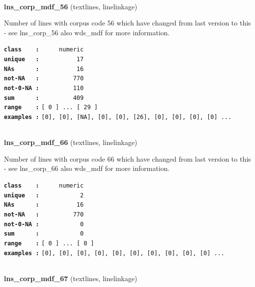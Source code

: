 \documentclass[]{article}
\begin{document}
~

\textbf{lns\_corp\_mdf\_56} (textlines, linelinkage)

Number of lines with corpus code 56 which have changed from last version
to this - see lns\_corp\_56 also wds\_mdf for more information.

\textbf{\texttt{class\ \ \ \ :}} \texttt{~~~~~numeric}\\
\textbf{\texttt{unique\ \ \ :}} \texttt{~~~~~~~~~~17}\\
\textbf{\texttt{NAs\ \ \ \ \ \ :}} \texttt{~~~~~~~~~~16}\\
\textbf{\texttt{not-NA\ \ \ :}} \texttt{~~~~~~~~~770}\\
\textbf{\texttt{not-0-NA\ :}} \texttt{~~~~~~~~~110}\\
\textbf{\texttt{sum\ \ \ \ \ \ :}} \texttt{~~~~~~~~~409}\\
\textbf{\texttt{range\ \ \ \ :}}
\texttt{{[}\ 0\ {]}\ ...\ {[}\ 29\ {]}}\\
\textbf{\texttt{examples\ :}}
\texttt{{[}0{]},\ {[}0{]},\ {[}NA{]},\ {[}0{]},\ {[}0{]},\ {[}26{]},\ {[}0{]},\ {[}0{]},\ {[}0{]},\ {[}0{]}\ ...}\\

~

\textbf{lns\_corp\_mdf\_66} (textlines, linelinkage)

Number of lines with corpus code 66 which have changed from last version
to this - see lns\_corp\_66 also wds\_mdf for more information.

\textbf{\texttt{class\ \ \ \ :}} \texttt{~~~~~numeric}\\
\textbf{\texttt{unique\ \ \ :}} \texttt{~~~~~~~~~~~2}\\
\textbf{\texttt{NAs\ \ \ \ \ \ :}} \texttt{~~~~~~~~~~16}\\
\textbf{\texttt{not-NA\ \ \ :}} \texttt{~~~~~~~~~770}\\
\textbf{\texttt{not-0-NA\ :}} \texttt{~~~~~~~~~~~0}\\
\textbf{\texttt{sum\ \ \ \ \ \ :}} \texttt{~~~~~~~~~~~0}\\
\textbf{\texttt{range\ \ \ \ :}}
\texttt{{[}\ 0\ {]}\ ...\ {[}\ 0\ {]}}\\
\textbf{\texttt{examples\ :}}
\texttt{{[}0{]},\ {[}0{]},\ {[}0{]},\ {[}0{]},\ {[}0{]},\ {[}0{]},\ {[}0{]},\ {[}0{]},\ {[}0{]},\ {[}0{]}\ ...}\\

~

\textbf{lns\_corp\_mdf\_67} (textlines, linelinkage)
\end{document}
